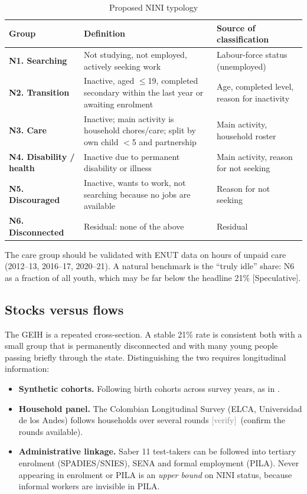 \documentclass[11pt]{article}
\newcommand{\spec}{\textcolor{red!70!black}{\textsf{\footnotesize[Speculative]}}}
\newcommand{\verify}{\textcolor{gray}{\textsf{\footnotesize[verify]}}}
\begin{document}
\begin{table}[htbp]
\centering\small
\caption{Proposed NINI typology}\label{tab:typology}
\begin{tabularx}{\linewidth}{P{3.2cm}LP{4.3cm}}
\toprule
Group & Definition & Source of classification \\
\midrule
\textbf{N1. Searching} & Not studying, not employed, actively seeking work & Labour-force status (unemployed) \\
\textbf{N2. Transition} & Inactive, aged $\le$19, completed secondary within the last year or awaiting enrolment & Age, completed level, reason for inactivity \\
\textbf{N3. Care} & Inactive; main activity is household chores/care; split by own child $<$5 and partnership & Main activity, household roster \\
\textbf{N4. Disability / health} & Inactive due to permanent disability or illness & Main activity, reason for not seeking \\
\textbf{N5. Discouraged} & Inactive, wants to work, not searching because no jobs are available & Reason for not seeking \\
\textbf{N6. Disconnected} & Residual: none of the above & Residual \\
\bottomrule
\end{tabularx}
\end{table}

The care group should be validated with ENUT data on hours of unpaid care (2012--13, 2016--17, 2020--21). A natural benchmark is the ``truly idle'' share: N6 as a fraction of all youth, which may be far below the headline 21\% \spec.

\subsection{Stocks versus flows}

The GEIH is a repeated cross-section. A stable 21\% rate is consistent both with a small group that is permanently disconnected and with many young people passing briefly through the state. Distinguishing the two requires longitudinal information:

\begin{itemize}
\item \textbf{Synthetic cohorts.} Following birth cohorts across survey years, as in \citet{lasso2026}.
\item \textbf{Household panel.} The Colombian Longitudinal Survey (ELCA, Universidad de los Andes) follows households over several rounds \verify\ (confirm the rounds available).
\item \textbf{Administrative linkage.} Saber 11 test-takers can be followed into tertiary enrolment (SPADIES/SNIES), SENA and formal employment (PILA). Never appearing in enrolment or PILA is an \emph{upper bound} on NINI status, because informal workers are invisible in PILA.
\end{itemize}
\end{document}
